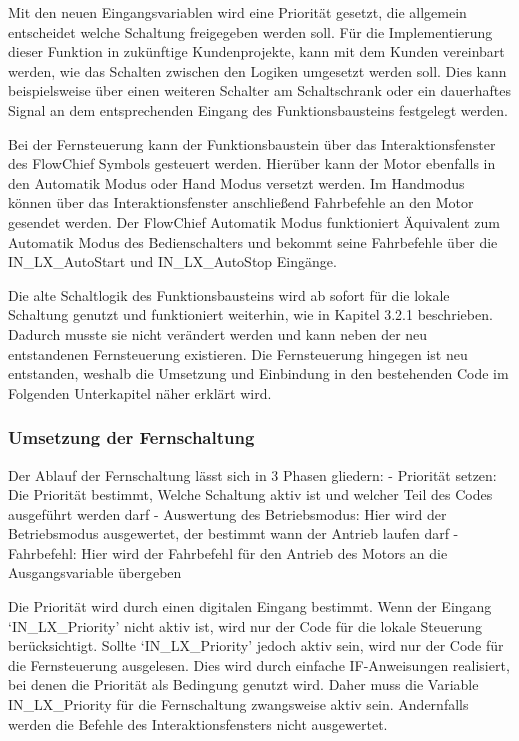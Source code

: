 Mit den neuen Eingangsvariablen wird eine Priorität gesetzt, die allgemein entscheidet welche Schaltung freigegeben werden soll. Für die Implementierung dieser Funktion in zukünftige Kundenprojekte, kann mit dem Kunden vereinbart werden, wie das Schalten zwischen den Logiken umgesetzt werden soll. Dies kann beispielsweise über einen weiteren Schalter am Schaltschrank oder ein dauerhaftes Signal an dem entsprechenden Eingang des Funktionsbausteins festgelegt werden.

Bei der Fernsteuerung kann der Funktionsbaustein über das Interaktionsfenster des FlowChief Symbols gesteuert werden. Hierüber kann der Motor ebenfalls in den Automatik Modus oder Hand Modus versetzt werden. Im Handmodus können über das Interaktionsfenster anschließend Fahrbefehle an den Motor gesendet werden. Der FlowChief Automatik Modus funktioniert Äquivalent zum Automatik Modus des Bedienschalters und bekommt seine Fahrbefehle über die IN_LX_AutoStart und IN_LX_AutoStop Eingänge.

Die alte Schaltlogik des Funktionsbausteins wird ab sofort für die lokale Schaltung genutzt und funktioniert weiterhin, wie in Kapitel 3.2.1 beschrieben. Dadurch musste sie nicht verändert werden und kann neben der neu entstandenen Fernsteuerung existieren. Die Fernsteuerung hingegen ist neu entstanden, weshalb die Umsetzung und Einbindung in den bestehenden Code im Folgenden Unterkapitel näher erklärt wird.

\subsubsection{Umsetzung der Fernschaltung}
Der Ablauf der Fernschaltung lässt sich in 3 Phasen gliedern:
-	Priorität setzen: Die Priorität bestimmt, Welche Schaltung aktiv ist und welcher Teil des Codes ausgeführt werden darf
-	Auswertung des Betriebsmodus: Hier wird der Betriebsmodus ausgewertet, der bestimmt wann der Antrieb laufen darf 
-	Fahrbefehl: Hier wird der Fahrbefehl für den Antrieb des Motors an die Ausgangsvariable übergeben

Die Priorität wird durch einen digitalen Eingang bestimmt. Wenn der Eingang ‘IN_LX_Priority’ nicht aktiv ist, wird nur der Code für die lokale Steuerung berücksichtigt. Sollte ‘IN_LX_Priority’ jedoch aktiv sein, wird nur der Code für die Fernsteuerung ausgelesen. Dies wird durch einfache IF-Anweisungen realisiert, bei denen die Priorität als Bedingung genutzt wird. Daher muss die Variable IN_LX_Priority für die Fernschaltung zwangsweise aktiv sein. Andernfalls werden die Befehle des Interaktionsfensters nicht ausgewertet.

